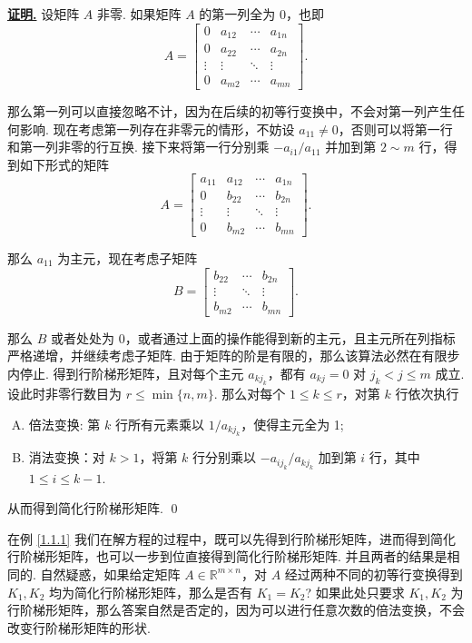 \documentclass[10pt,openany]{article}
\theoremstyle{thmstyle} %
\theoremstyle{defstyle} %
\theoremstyle{prostyle} %
\theoremstyle{exastyle}
\theoremstyle{remstyle}
\renewenvironment{proof}[1][证明]{\par\underline{\textbf{#1.}} \;\fangsong}{\qed\par}
\begin{document}
\begin{proof}
	设矩阵 \( A \) 非零. 如果矩阵 \( A \) 的第一列全为 0，也即
	\[ A=\begin{bmatrix}
		0 & a_{12} & \cdots & a_{1n} \\
		0 & a_{22} & \cdots & a_{2n} \\
		\vdots & \vdots & \ddots & \vdots \\
		0 & a_{m2} & \cdots & a_{mn}
	\end{bmatrix}. \]
	
	那么第一列可以直接忽略不计，因为在后续的初等行变换中，不会对第一列产生任何影响. 现在考虑第一列存在非零元的情形，不妨设 \( a_{11} \neq 0 \)，否则可以将第一行和第一列非零的行互换. 接下来将第一行分别乘 \( -a_{i1}/a_{11} \) 并加到第 \( 2 \sim m \) 行，得到如下形式的矩阵
	\[ A=\begin{bmatrix}
		a_{11} & a_{12} & \cdots & a_{1n} \\
		0 & b_{22} & \cdots & b_{2n} \\
		\vdots & \vdots & \ddots & \vdots \\
		0 & b_{m2} & \cdots & b_{mn}
	\end{bmatrix}. \] 
	
	那么 \( a_{11} \) 为主元，现在考虑子矩阵
	\[ B=\begin{bmatrix}
		 b_{22} & \cdots & b_{2n} \\
		 \vdots & \ddots & \vdots \\
		 b_{m2} & \cdots & b_{mn}
	\end{bmatrix}. \]
	
	那么 \( B \) 或者处处为 0，或者通过上面的操作能得到新的主元，且主元所在列指标严格递增，并继续考虑子矩阵. 由于矩阵的阶是有限的，那么该算法必然在有限步内停止. 得到行阶梯形矩阵，且对每个主元 \( a_{kj_k} \)，都有 \( a_{kj}=0 \) 对 \( j_k<j \leq m  \) 成立. 设此时非零行数目为 \(  r \leq \min\{ n,m \} \). 那么对每个 \( 1 \leq k \leq r \)，对第 \( k \) 行依次执行
	\begin{enumerate}[(A)]
		\item 倍法变换: 第 \( k \) 行所有元素乘以 \( 1/a_{kj_k} \)，使得主元全为 1;
		\item 消法变换：对 \( k>1 \)，将第 \( k \) 行分别乘以 \( -a_{ij_k}/a_{kj_k} \) 加到第 \( i \) 行，其中 \( 1 \leq i \leq k-1 \).
	\end{enumerate}
	
	从而得到简化行阶梯形矩阵.
\end{proof}



在例 \ref{1.1.1} 我们在解方程的过程中，既可以先得到行阶梯形矩阵，进而得到简化行阶梯形矩阵，也可以一步到位直接得到简化行阶梯形矩阵. 并且两者的结果是相同的. 自然疑惑，如果给定矩阵 \( A \in \mathbb{R}^{m \times n} \)，对 \( A \) 经过两种不同的初等行变换得到 \( K_1, K_2 \) 均为简化行阶梯形矩阵，那么是否有 \( K_1 = K_2 \)? 如果此处只要求 \( K_1, K_2 \) 为行阶梯形矩阵，那么答案自然是否定的，因为可以进行任意次数的倍法变换，不会改变行阶梯形矩阵的形状. 
\end{document}
